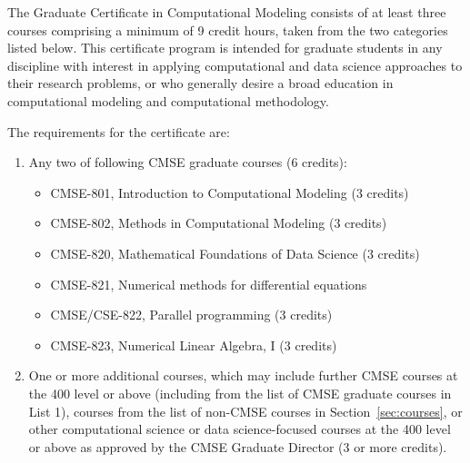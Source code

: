 The Graduate Certificate in Computational Modeling consists of at least
three courses comprising a minimum of 9 credit hours, taken from the
two categories listed below.  This certificate program is intended for
graduate students in any discipline with interest in applying
computational and data science approaches to their research problems,
or who generally desire a broad education in computational modeling
and computational methodology.  

\vspace{2mm}
\noindent
The requirements for the certificate are:

\begin{enumerate}
\item Any two of following CMSE graduate courses (6 credits):  

\begin{itemize}
    \item  CMSE-801, Introduction to Computational Modeling (3 credits)
    \item  CMSE-802, Methods in Computational Modeling (3 credits)  
    \item  CMSE-820, Mathematical Foundations of Data Science (3 credits)  
    \item  CMSE-821, Numerical methods for differential equations
    \item  CMSE/CSE-822, Parallel programming (3 credits) 
    \item  CMSE-823, Numerical Linear Algebra, I (3 credits)
\end{itemize}

\item One or more additional courses, which may include further CMSE
  courses at the 400 level or above (including from the list of 
  CMSE graduate courses in List 1), courses from the list of non-CMSE
  courses  in Section~\ref{sec:courses}, or other computational
  science or data science-focused courses at the 400 level or above as
  approved by the CMSE Graduate Director (3 or more credits).

\end{enumerate}

